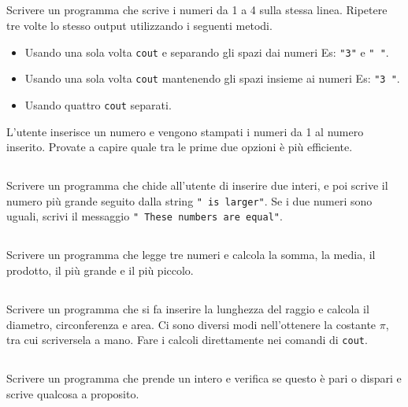 \documentclass{article}
\begin{document}
\subsection{}
Scrivere un programma che scrive i numeri da 1 a 4 sulla stessa linea. Ripetere tre volte lo stesso output utilizzando i seguenti metodi.
\begin{itemize}
	\item Usando una sola volta \texttt{cout} e separando gli spazi dai numeri Es: \texttt{"3"} e \texttt{" "}.
	\item Usando una sola volta \texttt{cout} mantenendo gli spazi insieme ai numeri Es: \texttt{"3 "}.
	\item Usando quattro \texttt{cout} separati.
\end{itemize}


\vspace{-10pt}
\begin{warn}[Estensione:]
	L'utente inserisce un numero e vengono stampati i numeri da 1 al numero inserito. Provate a capire quale tra le prime due opzioni è più efficiente.
\end{warn}

\subsection{}
Scrivere un programma che chide all'utente di inserire due interi, e poi scrive il numero più grande seguito dalla string \texttt{" is larger"}. Se i due numeri sono uguali, scrivi il messaggio \texttt{" These numbers are equal"}.

\subsection{}
Scrivere un programma che legge tre numeri e calcola la somma, la media, il prodotto, il più grande e il più piccolo.

\subsection{}
Scrivere un programma che si fa inserire la lunghezza del raggio e calcola il diametro, circonferenza e area. Ci sono diversi modi nell'ottenere la costante $\pi$, tra cui scriversela a mano. Fare i calcoli direttamente nei comandi di \texttt{cout}.

\subsection{}
Scrivere un programma che prende un intero e verifica se questo è pari o dispari e scrive qualcosa a proposito.
\end{document}
